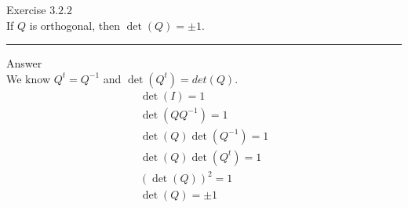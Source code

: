 \documentclass[12pt]{article}
\begin{document}
Exercise $3.2.2$\\

If $Q$ is orthogonal, then $\det (Q) = \pm1$.

\noindent\rule{\textwidth}{1pt}

Answer\\

We know $Q^t = Q^{-1}$ and $\det (Q^t) = det(Q)$. 
\begin{equation*}
\begin{gathered}
\det (I) = 1\\
\det(QQ^{-1}) = 1\\
\det(Q) \det(Q^{-1}) = 1\\
\det(Q) \det(Q^t) = 1\\
(\det(Q))^2 = 1\\
\det(Q) = \pm1
\end{gathered}
\end{equation*}
\end{document}

